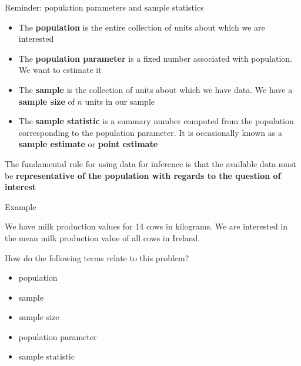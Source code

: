 \documentclass[12pt,xcolor=dvipsnames,handout,mathserif,aspectratio=169]{beamer}
\newcommand{\bbl}[1]{{\color{NavyBlue} \textbf{#1}}}
\newcommand{\bre}[1]{{\color{red} \textbf{#1}}}
\newcommand{\bgr}[1]{{\color{PineGreen} \textbf{#1}}}
\begin{document}
\begin{frame}{Reminder: population parameters and sample statistics}

\begin{itemize}
\item The \bbl{population} is the entire collection of units about which we are interested
\item The \bre{population parameter} is a fixed number associated with population. We want to estimate it
\item The \bgr{sample} is the collection of units about which we have data. We have a \textbf{sample size} of $n$ units in our sample
\item The \bbl{sample statistic} is a summary number computed from the population corresponding to the population parameter. It is occasionally known as a \bre{sample estimate} or \bgr{point estimate}
\end{itemize}
\pause
\begin{block}{}
The fundamental rule for using data for inference is that the available data must be \bre{representative of the population with regards to the question of interest}
\end{block}
\end{frame}

\begin{frame}{Example}
\begin{block}{}
We have milk production values for 14 cows in kilograms. We are interested in the mean milk production value of all cows in Ireland.
\end{block}
How do the following terms relate to this problem?
\pause
\begin{itemize}
\item population
\pause
\item sample
\pause
\item sample size
\pause
\item population parameter
\pause
\item sample statistic
\end{itemize}

\end{frame}
\end{document}
